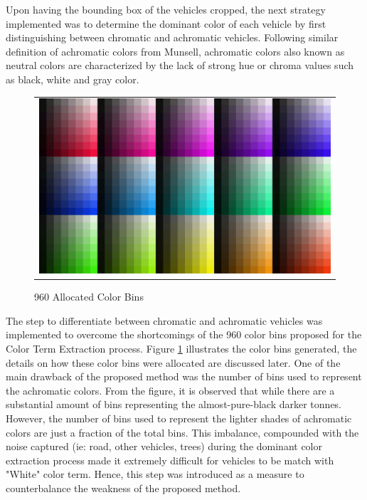 Upon having the bounding box of the vehicles cropped, the next strategy implemented was to determine the dominant color of each vehicle by first distinguishing between chromatic and achromatic vehicles. Following similar definition of achromatic colors from Munsell, achromatic colors also known as neutral colors are characterized by the lack of strong hue or chroma values such as black, white and gray color.

\begin{figure}[htb!]
  \centering
\begin{tabular}{c}
 \includegraphics[width=0.7\linewidth]{image/retrievalOne/all.png} \\  
\end{tabular}
\caption{960 Allocated Color Bins} \label{fig:hsvAllocated}
\end{figure}

The step to differentiate between chromatic and achromatic vehicles was implemented to overcome the shortcomings of the 960 color bins proposed for the Color Term Extraction process. Figure \ref{fig:hsvAllocated} illustrates the color bins generated, the details on how these color bins were allocated are discussed later. One of the main drawback of the proposed method was the number of bins used to represent the achromatic colors. From the figure, it is observed that while there are a substantial amount of bins representing the almost-pure-black darker tonnes. However, the number of bins used to represent the lighter shades of achromatic colors are just a fraction of the total bins. 
This imbalance, compounded with the noise captured (ie: road, other vehicles, trees) during the dominant color extraction process made it extremely difficult for vehicles to be match with "White" color term. Hence, this step was introduced as a measure to counterbalance the weakness of the proposed method. 


